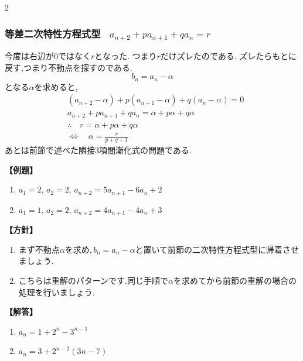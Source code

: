 \documentclass[dvipdfmx,a4paper,11pt,fleqn,openany]{jsbook}
\begin{document}
\begin{multicols*}{2}
    \subsubsection{等差二次特性方程式型 \, $\displaystyle a_{n+2}+pa_{n+1}+qa_n=r$}
      今度は右辺が0ではなく$r$となった.
      つまり$r$だけズレたのである.
      ズレたらもとに戻す,つまり不動点を探すのである.
      \[
        b_n=a_n-\alpha
      \]
      となる$\alpha$を求めると,
      \begin{align*}
        &(a_{n+2}-\alpha)+p(a_{n+1}-\alpha)+q(a_n-\alpha)=0\\
        &a_{n+2}+pa_{n+1}+qa_n=\alpha+p\alpha+q\alpha\\
        &\therefore \quad r=\alpha +p\alpha +q\alpha\\
        &\Leftrightarrow \quad \alpha=\frac{r}{p+q+1}
      \end{align*}
      あとは前節で述べた隣接3項間漸化式の問題である.

      \noindent \textbf{【例題】}
      \begin{enumerate}[label=(\arabic*),parsep=3pt]
        \item $\displaystyle a_1=2,\,a_2=2,\, a_{n+2}=5a_{n+1}-6a_n+2$
        \item $\displaystyle a_1=1,\,a_2=2,\, a_{n+2}=4a_{n+1}-4a_n+3$
      \end{enumerate}

      \noindent\textbf{【方針】}
      \begin{enumerate}[label=(\arabic*),parsep=3pt]
        \item まず不動点$\alpha$を求め,\,$b_n=a_n-\alpha$と置いて前節の二次特性方程式型に帰着させましょう.
        \item こちらは重解のパターンです.同じ手順で$\alpha$を求めてから前節の重解の場合の処理を行いましょう.
      \end{enumerate}

      \noindent\textbf{【解答】}
      \begin{enumerate}[label=(\arabic*),parsep=3pt]
        \item $\displaystyle a_n=1+2^n-3^{n-1}$
        \item $\displaystyle a_n=3+2^{n-2}(3n-7)$
      \end{enumerate}


\end{multicols*}
\end{document}
